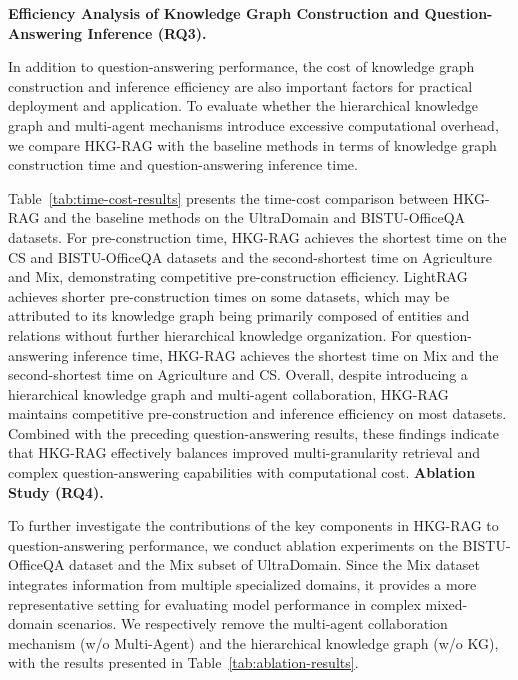 \documentclass[preprint,12pt,authoryear]{elsarticle}
\begin{document}
%
\noindent\textbf{Efficiency Analysis of Knowledge Graph Construction and Question-Answering Inference (RQ3).}

In addition to question-answering performance, the cost of knowledge graph construction and inference efficiency are also important factors for practical deployment and application. To evaluate whether the hierarchical knowledge graph and multi-agent mechanisms introduce excessive computational overhead, we compare HKG-RAG with the baseline methods in terms of knowledge graph construction time and question-answering inference time.



Table~\ref{tab:time-cost-results} presents the time-cost comparison between HKG-RAG and the baseline methods on the UltraDomain and BISTU-OfficeQA datasets. For pre-construction time, HKG-RAG achieves the shortest time on the CS and BISTU-OfficeQA datasets and the second-shortest time on Agriculture and Mix, demonstrating competitive pre-construction efficiency. LightRAG achieves shorter pre-construction times on some datasets, which may be attributed to its knowledge graph being primarily composed of entities and relations without further hierarchical knowledge organization. For question-answering inference time, HKG-RAG achieves the shortest time on Mix and the second-shortest time on Agriculture and CS. Overall, despite introducing a hierarchical knowledge graph and multi-agent collaboration, HKG-RAG maintains competitive pre-construction and inference efficiency on most datasets. Combined with the preceding question-answering results, these findings indicate that HKG-RAG effectively balances improved multi-granularity retrieval and complex question-answering capabilities with computational cost.
\FloatBarrier
\noindent\textbf{Ablation Study (RQ4).}

To further investigate the contributions of the key components in HKG-RAG to question-answering performance, we conduct ablation experiments on the BISTU-OfficeQA dataset and the Mix subset of UltraDomain. Since the Mix dataset integrates information from multiple specialized domains, it provides a more representative setting for evaluating model performance in complex mixed-domain scenarios. We respectively remove the multi-agent collaboration mechanism (w/o Multi-Agent) and the hierarchical knowledge graph (w/o KG), with the results presented in Table~\ref{tab:ablation-results}.

\FloatBarrier
\end{document}
